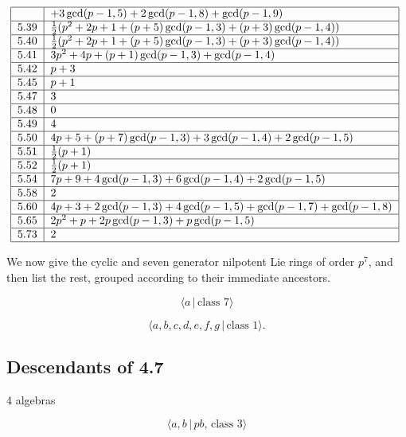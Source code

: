\documentclass[10pt]{article}
\begin{document}
{\[\begin{tabular}{|l|l|}
\hline
& $+3\gcd (p-1,5)+2\gcd (p-1,8)+\gcd (p-1,9)$ \\ \hline
5.39 & $\frac{1}{2}\allowbreak (p^{2}+2p+1+(p+5)\gcd (p-1,3)+(p+3)\gcd
(p-1,4))$ \\ \hline
5.40 & $\frac{1}{2}\allowbreak (p^{2}+2p+1+(p+5)\gcd (p-1,3)+(p+3)\gcd
(p-1,4))$ \\ \hline
5.41 & $3p^{2}+4p+(p+1)\gcd (p-1,3)+\gcd (p-1,4)$ \\ \hline
5.42 & $p+3$ \\ \hline
5.45 & $p+1$ \\ \hline
5.47 & $3$ \\ \hline
5.48 & $0$ \\ \hline
5.49 & $4$ \\ \hline
5.50 & $4p+5+(p+7)\gcd (p-1,3)+3\gcd (p-1,4)+2\gcd (p-1,5)$ \\ \hline
5.51 & $\frac{1}{2}(p+1)$ \\ \hline
5.52 & $\frac{1}{2}(p+1)$ \\ \hline
5.54 & $7p+9+4\gcd (p-1,3)+6\gcd (p-1,4)+2\gcd (p-1,5)$ \\ \hline
5.58 & $2$ \\ \hline
5.60 & $4p+3+2\gcd (p-1,3)+4\gcd (p-1,5)+\gcd (p-1,7)+\gcd (p-1,8)$ \\ \hline
5.65 & $2p^{2}+p+2p\gcd (p-1,3)+p\gcd (p-1,5)$ \\ \hline
5.73 & $2$ \\ \hline
\end{tabular}%
\ 
\]%
}

We now give the cyclic and seven generator nilpotent Lie rings of order $%
p^{7}$, and then list the rest, grouped according to their immediate
ancestors.

\begin{equation}
\langle a\,|\,\text{class }7\rangle  \tag{7.0}
\end{equation}

\begin{equation}
\langle a,b,c,d,e,f,g\,|\,\text{class }1\rangle .  \tag{7.1}
\end{equation}

\subsection{Descendants of 4.7}

4 algebras

\begin{equation}
\langle a,b\,|\,pb,\,\text{class }3\rangle  \tag{7.2}
\end{equation}
\end{document}
